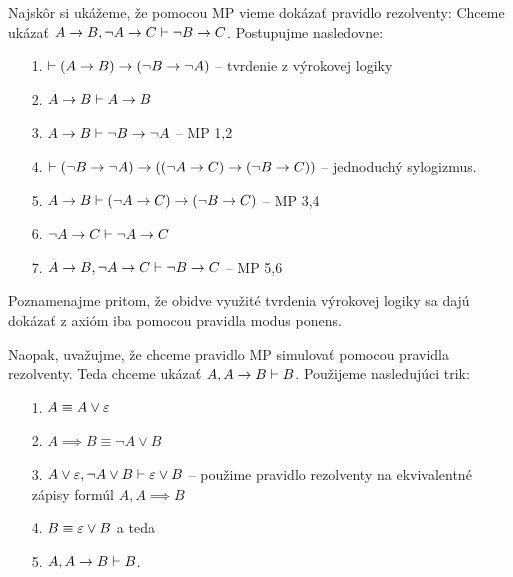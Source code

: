 \begin{dokaz}
    Najskôr si ukážeme, že pomocou MP vieme dokázať pravidlo rezolventy:
    Chceme ukázať $A \rightarrow B, \neg A \rightarrow C \vdash \neg B
    \rightarrow C$.
    Postupujme nasledovne:
    \begin{itemize}
        \item[1.] $\vdash (A \rightarrow B) \rightarrow (\neg B \rightarrow
                \neg A)$ -- tvrdenie z výrokovej logiky
        \item[2.] $A \rightarrow B \vdash A \rightarrow B$
        \item[3.] $A \rightarrow B \vdash \neg B \rightarrow \neg A$ --
                MP 1,2
        \item[4.] $\vdash (\neg B \rightarrow \neg A) \rightarrow
            ((\neg A \rightarrow C) \rightarrow (\neg B \rightarrow C))$ --
                jednoduchý sylogizmus.
        \item[5.] $A \rightarrow B \vdash
            (\neg A \rightarrow C) \rightarrow (\neg B \rightarrow C)$ -- MP
            3,4
        \item[6.] $\neg A \rightarrow C \vdash \neg A \rightarrow C$
        \item[7.] $A \rightarrow B, \neg A \rightarrow C \vdash
            \neg B \rightarrow C$ -- MP 5,6
    \end{itemize}
    Poznamenajme pritom, že obidve využité tvrdenia výrokovej logiky
    sa dajú dokázať z axióm iba pomocou pravidla modus ponens.

    Naopak, uvažujme, že chceme pravidlo MP simulovať pomocou pravidla
    rezolventy. Teda chceme ukázať $A, A\rightarrow B \vdash B$.
    Použijeme nasledujúci trik:
    \begin{itemize}
        \item[1.] $A \equiv A \lor \varepsilon$
        \item[2.] $A \implies B \equiv \neg A \lor B$
        \item[3.] $A \lor \varepsilon, \neg A \lor B \vdash \varepsilon \lor B$
            -- použime pravidlo rezolventy na ekvivalentné zápisy
            formúl $A, A\implies B$
        \item[4.] $B \equiv \varepsilon \lor B$ a teda
        \item[5.] $A,A\rightarrow B \vdash B$.
    \end{itemize}
\end{dokaz}

